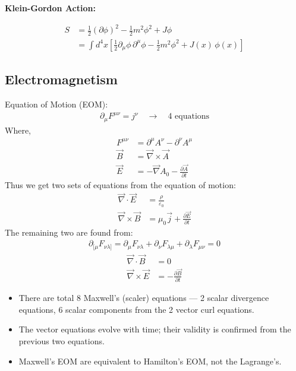 \documentclass[14pt]{article} %
\begin{document}
\textbf{Klein-Gordon Action:}

\begin{align*}
S &= \frac{1}{2} (\partial \phi)^2 - \frac{1}{2} m^2 \phi^2 + J\phi \\
  &= \int d^4x \left[ \frac{1}{2} \partial_\mu \phi \,\partial^\mu \phi - \frac{1}{2} m^2 \phi^2 + J(x)\, \phi(x) \right]
\end{align*}

\subsection{Electromagnetism}
Equation of Motion (EOM):
\begin{align*}
\partial_\mu F^{\mu \nu} = j^\nu \quad \to \quad 4\text{ equations}
\end{align*}
Where,
\begin{align*}
F^{\mu \nu} &= \partial^\mu A^\nu - \partial^\nu A^\mu \\
\vec{B} &= \vec{\nabla} \times \vec{A} \\
\vec{E} &= -\vec{\nabla} A_0 - \frac{\partial \vec{A}}{\partial t}
\end{align*}
Thus we get two sets of equations from the equation of motion:
\begin{align*}
\vec{\nabla} \cdot \vec{E} &= \frac{\rho}{\varepsilon_0} \tag{M1} \\
\vec{\nabla} \times \vec{B} &= \mu_0 \vec{j} + \frac{\partial \vec{E}}{\partial t} \tag{M3}
\end{align*}
The remaining two are found from:
\begin{align*}
\partial_{[\mu}F_{\nu \lambda ]} = \partial_\mu F_{\nu \lambda} + \partial_\nu F_{\lambda \mu} + \partial_\lambda F_{\mu \nu} = 0 \tag*{[Bianchi identity]}
\end{align*}
\begin{align*}
\vec{\nabla} \cdot \vec{B} &= 0 \tag{M2} \\
\vec{\nabla} \times \vec{E} &= -\frac{\partial \vec{B}}{\partial t} \tag{M4}
\end{align*}
\begin{tcolorbox}[ title=Notes]
\begin{itemize}
    \item There are total 8 Maxwell’s (scaler) equations — 2 scalar divergence equations, 6 scalar components from the 2 vector curl equations.
    \item The vector equations evolve with time; their validity is confirmed from the previous two equations.
    \item Maxwell's EOM are equivalent to Hamilton's EOM, not the Lagrange's.
\end{itemize}
\end{tcolorbox}
\end{document}
